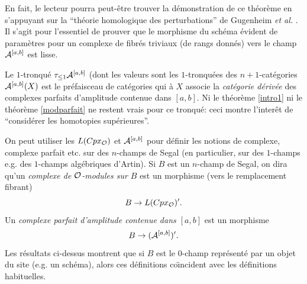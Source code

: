 \documentclass[12pt]{article}
\newcommand{\Oo}{{\cal O}}
\begin{document}
En fait, le lecteur pourra peut-\^etre trouver la d\'emonstration de ce
th\'eor\`eme en s'\-ap\-puy\-ant sur la ``th\'eorie homologique des
perturbations'' de Gugenheim {\em et al.} \cite{Gugenheim}
\cite{GugenheimLambe}. Il s'agit pour l'essentiel de prouver que le morphisme du
sch\'ema \'evident de param\`etres pour un complexe de fibr\'es triviaux (de
rangs donn\'es) vers le champ ${\cal  A}^{[a,b]}$ est lisse.



Le $1$-tronqu\'e $\tau _{\leq 1}{\cal  A}^{[a,b]}$ (dont les valeurs
sont les $1$-tronqu\'ees des $n+1$-cat\'egories ${\cal  A}^{[a,b]}(X)$
est le pr\'efaisceau de cat\'egories qui \`a $X$ associe la {\em cat\'egorie
d\'eriv\'ee} des complexes parfaits d'amplitude contenue dans $[a,b]$. Ni
le th\'eor\`eme \ref{intro1} ni
le th\'eor\`eme \ref{modparfait} ne restent vrais pour ce
tronqu\'e: ceci montre l'inter\^et de ``consid\'erer les homotopies
sup\'erieures''.

On peut utiliser les $L(Cpx _{\Oo})$ et ${\cal A}^{[a,b]}$ pour d\'efinir
les notions de complexe,
complexe parfait etc. sur des $n$-champs de Segal (en particulier, sur des
$1$-champs e.g. des
$1$-champs alg\'ebriques d'Artin). Si $B$ est un $n$-champ de Segal, on
dira qu'un {\em complexe de
$\Oo$-modules sur $B$} est un morphisme (vers le remplacement fibrant)
$$
B\rightarrow L(Cpx
_{\Oo})'.
$$
Un {\em complexe parfait d'amplitude contenue dans $[a,b]$} est un morphisme
$$
B\rightarrow ({\cal A}^{[a,b]})'.
$$
Les r\'esultats ci-dessus montrent que si $B$ est le $0$-champ repr\'esent\'e
par un objet du site
(e.g. un sch\'ema),
alors ces d\'efinitions co\"{\i}ncident avec les d\'efinitions habituelles.

\newpage
\end{document}
